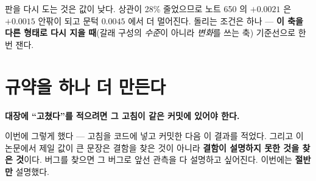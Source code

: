 \documentclass[10pt,a4paper]{article}
\begin{document}
판을 다시 도는 것은 값이 낮다. 상관이 28\% 줄었으므로 노트 650 의 $+0.0021$ 은
$+0.0015$ 안팎이 되고 문턱 $0.0045$ 에서 더 멀어진다. 돌리는 조건은 하나 ---
\textbf{이 축을 다른 형태로 다시 지을 때}(갈래 구성의 \emph{수준}이 아니라
\emph{변화}를 쓰는 축) 기준선으로 한 번 잰다.

\section{규약을 하나 더 만든다}

\begin{center}
\textbf{대장에 ``고쳤다''를 적으려면 그 고침이 같은 커밋에 있어야 한다.}
\end{center}

이번에 그렇게 했다 --- 고침을 코드에 넣고 커밋한 다음 이 결과를 적었다. 그리고
이 논문에서 제일 값이 큰 문장은 결함을 찾은 것이 아니라 \textbf{결함이 설명하지
못한 것을 찾은 것}이다. 버그를 찾으면 그 버그로 앞선 관측을 다 설명하고 싶어진다.
이번에는 \textbf{절반만} 설명했다.
\end{document}
